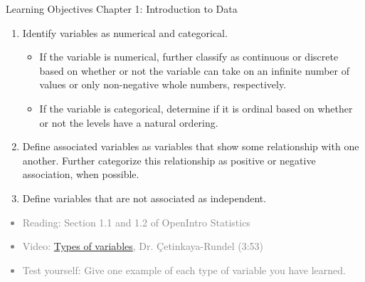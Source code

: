 \documentclass[11pt]{article}
\newcommand{\gray}[1]{\textcolor{gray}{#1}}
\begin{document}
{\LARGE \textcolor{oiB}{Learning Objectives \hfill Chapter 1: Introduction to Data}} \\

\begin{enumerate}
\renewcommand\labelenumi{\textcolor{light}{\textbf{LO \theenumi.}}}
\item Identify variables as numerical and categorical.
\begin{itemize}
\renewcommand{\labelitemi}{{\textcolor{dark}{{\tiny $\blacksquare$}}}}
\item If the variable is numerical, further classify as continuous or discrete based on whether or not the variable can take on an infinite number of values or only non-negative whole numbers, respectively.
\item If the variable is categorical, determine if it is ordinal based on whether or not the levels have a natural ordering. 
\end{itemize}

\item Define associated variables as variables that show some relationship with one another. Further categorize this relationship as positive or negative association, when possible.

\item Define variables that are not associated as independent.

\end{enumerate}

\gray{
{\it
\vspace{-0.75cm}
\begin{itemize}
\renewcommand{\labelitemi}{{\textcolor{dark}{$\ast$}}}
\item Reading: Section 1.1 and 1.2 of OpenIntro Statistics
\item Video: \href{http://youtu.be/haug_BjhgE0}{Types of variables}, Dr. \c{C}etinkaya-Rundel (3:53)
\item Test yourself: Give one example of each type of variable you have learned. \\
\end{itemize}
}}

%

\vspace{0.5cm}

%
\end{document}
